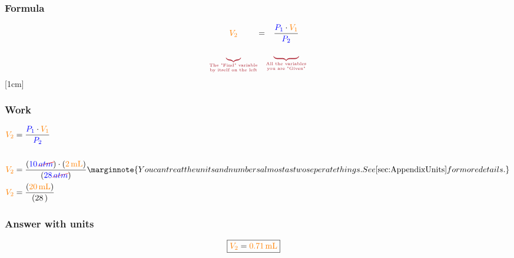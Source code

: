 \documentclass[../../main.tex]{subfiles}
\begin{document}
\subsubsection{Formula}

\[\textcolor{Maroon}{\underbrace{\mystrut{6ex}\textcolor{orange}{V_2}}_{\text{The "Find" variable} \atop \text{by itself on the left}}} \textcolor{black}{=} \textcolor{Maroon}{\underbrace{\textcolor{black}{\frac{\blue{P_1} \cdot \orange{V_1}}{\mystrut{4ex}\blue{P_2}}}}_{\text{All the variables} \atop \text{you are "Given"}}}\] %
[1cm]



\subsubsection{Work}
\begin{align*}
\orange{V_2} &= \frac{\blue{P_1} \cdot \orange{V_1}}{\blue{P_2}}\\
\\
\orange{V_2} &= \frac{(\blue{\qty{10}{\Ccancel[red]{atm}}}) \cdot (\orange{\qty{2}{\milli\liter}})}{(\blue{\qty{28}{\Ccancel[red]{atm}}})}\marginnote{You can treat the units and numbers almost as two seperate things.  See \ref{sec:AppendixUnits} for more details.}
\\
\orange{V_2} &= \frac{(\orange{\qty{20}{\milli\liter}})}{(\qty{28})}\\
\end{align*}

\subsubsection{Answer with units}
\begin{align*}
\Aboxed{\orange{V_2} &= \orange{\qty{0.71}{\milli\liter}}}
\end{align*}

\end{document}
